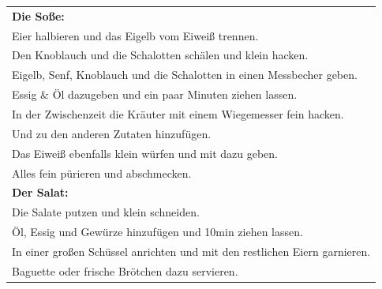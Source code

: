 \begin{tabular}{p{15cm}}
	\\
  \textbf{Die Soße:}\\
	Eier halbieren und das Eigelb vom Eiweiß trennen.\\
	Den Knoblauch und die Schalotten schälen und klein hacken.\\
	Eigelb, Senf, Knoblauch und die Schalotten in einen Messbecher geben.\\
	Essig \& Öl dazugeben und ein paar Minuten ziehen lassen.\\
	In der Zwischenzeit die Kräuter mit einem Wiegemesser fein hacken.\\
	Und zu den anderen Zutaten hinzufügen.\\
	Das Eiweiß ebenfalls klein würfen und mit dazu geben.\\
	Alles fein pürieren und abschmecken.\\
  \textbf{Der Salat:}\\
  Die Salate putzen und klein schneiden.\\
	Öl, Essig und Gewürze hinzufügen und 10min ziehen lassen.\\
	In einer großen Schüssel anrichten und mit den restlichen Eiern garnieren.\\
	Baguette oder frische Brötchen dazu servieren.\\
\end{tabular}
